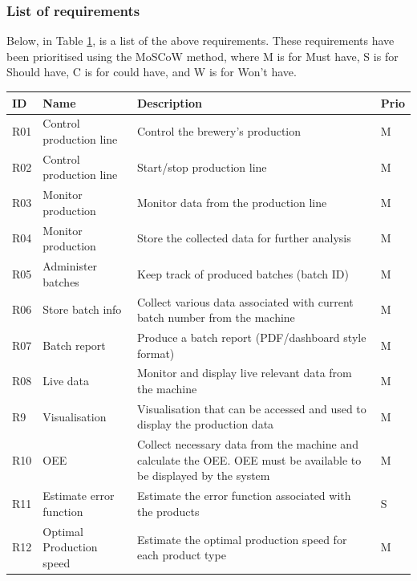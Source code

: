 \subsubsection{List of requirements}
Below, in Table \ref{table:Requirements}, is a list of the above requirements. These requirements have been
prioritised using the MoSCoW method, where M is for Must have, S is for
Should have, C is for could have, and W is for Won't have. 

\begin{table}[H]
    \begin{tabularx}{\textwidth}{|>{\RaggedRight}p{1cm}|>{\RaggedRight}p{4cm}|>{\RaggedRight}X|>{\RaggedRight}p{1cm}|}
        \hline
        \textbf{ID} & \textbf{Name} & \textbf{Description} & \textbf{Prio} \\
        \hline
        R01 & Control production line & Control the brewery's production & M \\
        \hline
        R02 & Control production line & Start/stop production line & M \\
        \hline
        R03 & Monitor production & Monitor data from the production line & M \\
        \hline
        R04 & Monitor production & Store the collected data for further analysis & M \\
        \hline
        R05 & Administer batches & Keep track of produced batches (batch ID) & M \\
        \hline
        R06 & Store batch info & Collect various data associated with current batch number from the machine & M \\
        \hline
        R07 & Batch report & Produce a batch report (PDF/dashboard style format) & M \\
        \hline
        R08 & Live data & Monitor and display live relevant data from the machine & M \\
        \hline
        R9 & Visualisation & Visualisation that can be accessed and used to display the production data & M \\
        \hline
        R10 & OEE & Collect necessary data from the machine and calculate the OEE. OEE must be available to be displayed by the system & M \\
        \hline
        R11 & Estimate error function & Estimate the error function associated with the products & S \\
        \hline
        R12 & Optimal Production speed & Estimate the optimal production speed for each product type & M \\
        \hline
    \end{tabularx}
    \label{table:Requirements}
\end{table}

